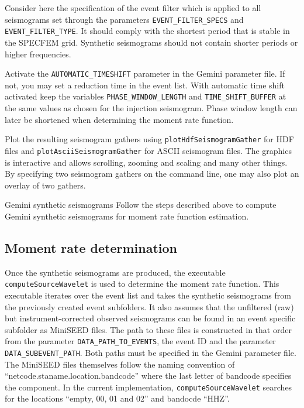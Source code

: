   Consider here the specification of the event filter which is applied to all seismograms set through the parameters \verb+EVENT_FILTER_SPECS+ and \verb+EVENT_FILTER_TYPE+. It should comply with the shortest period that is stable in the SPECFEM grid. Synthetic seismograms should not contain shorter periods or higher frequencies.

  Activate the \verb+AUTOMATIC_TIMESHIFT+ parameter in the Gemini parameter file. If not, you may set a reduction time in the event list. With automatic time shift activated keep the variables \verb+PHASE_WINDOW_LENGTH+ and \verb+TIME_SHIFT_BUFFER+ at the same values as chosen for the injection seismogram. Phase window length can later be shortened when determining the moment rate function.

  Plot the resulting seismogram gathers using \verb+plotHdfSeismogramGather+ for HDF files and \verb+plotAsciiSeismogramGather+ for ASCII seismogram files. The graphics is interactive and allows scrolling, zooming and scaling and many other things. By specifying two seismogram gathers on the command line, one may also plot an overlay of two gathers.
%
\begin{actionbox}[label={action:gemini-synthetics},float=h!]{Gemini synthetic seismograms}
   Follow the steps described above to compute Gemini synthetic seismograms for moment rate function estimation.
\end{actionbox}
%
\subsection{Moment rate determination}
%
 Once the synthetic seismograms are produced, the executable \verb+computeSourceWavelet+ is used to determine the moment rate function. This executable iterates over the event list and takes the synthetic seismograms from the previously created event subfolders. It also assumes that the unfiltered (raw) but instrument-corrected observed seismograms can be found in an event specific subfolder as MiniSEED files. The path to these files is constructed in that order from the parameter \verb+DATA_PATH_TO_EVENTS+, the event ID and the parameter \verb+DATA_SUBEVENT_PATH+. Both paths must be specified in the Gemini parameter file. The MiniSEED files themselves follow the naming convention of ``netcode.staname.location.bandcode'' where the last letter of bandcode specifies the component. In the current implementation, \verb+computeSourceWavelet+ searches for the locations ``empty, 00, 01 and 02'' and bandocde ``HHZ''.

